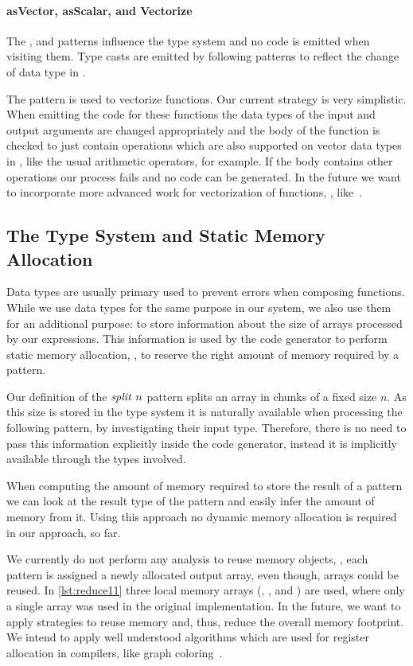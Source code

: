 \paragraph{{\footnotesize as}Vector, {\footnotesize as}Scalar, and Vectorize}
The \asVector, and \asScalar patterns influence the type system and no \OpenCL code is emitted when visiting them.
Type casts are emitted by following patterns to reflect the change of data type in \OpenCL.

The \vect pattern is used to vectorize functions.
Our current strategy is very simplistic.
When emitting the \OpenCL code for these functions the data types of the input and output arguments are changed appropriately and the body of the function is checked to just contain operations which are also supported on vector data types in \OpenCL, like the usual arithmetic operators, for example.
If the body contains other operations our process fails and no \OpenCL code can be generated.
In the future we want to incorporate more advanced work for vectorization of functions, \eg, like~\cite{KarrenbergHa2011}.


\subsection{The Type System and Static Memory Allocation}
\label{section:typeSystem}
Data types are usually primary used to prevent errors when composing functions.
While we use data types for the same purpose in our system, we also use them for an additional purpose: to store information about the size of arrays processed by our expressions.
This information is used by the code generator to perform static memory allocation, \ie, to reserve the right amount of memory required by a pattern.

Our definition of the $\text{\textit{split}}\ n$ pattern splits an array in chunks of a fixed size $n$.
As this size is stored in the type system it is naturally available when processing the following pattern, by investigating their input type.
Therefore, there is no need to pass this information explicitly inside the code generator, instead it is implicitly available through the types involved.

When computing the amount of memory required to store the result of a pattern we can look at the result type of the pattern and easily infer the amount of memory from it.
Using this approach no dynamic memory allocation is required in our approach, so far.

We currently do not perform any analysis to reuse memory objects, \ie, each pattern is assigned a newly allocated output array, even though, arrays could be reused.
In \autoref{lst:reduce11} three local memory arrays (, , and ) are used, where only a single array was used in the original \OpenCL implementation.
In the future, we want to apply strategies to reuse memory and, thus, reduce the overall memory footprint.
We intend to apply well understood algorithms which are used for register allocation in compilers, like graph coloring~\cite{CooperTo2004}.

